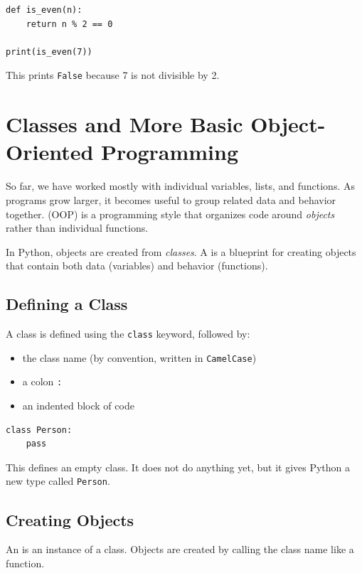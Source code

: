 \begin{Answer}[ref=functions2]
\begin{verbatim}
def is_even(n):
    return n % 2 == 0

print(is_even(7))
\end{verbatim}
This prints \texttt{False} because 7 is not divisible by 2.
\end{Answer}

\section{Classes and More Basic Object-Oriented Programming}

So far, we have worked mostly with individual variables, lists, and functions.
As programs grow larger, it becomes useful to group related data and behavior
together. 
(OOP) is a programming style that organizes code around \emph{objects} rather than
individual functions.

In Python, objects are created from \emph{classes}. A 
is a blueprint for creating objects that contain both data (variables) and
behavior (functions).

\subsection{Defining a Class}
A class is defined using the \texttt{class} keyword, followed by:
\begin{itemize}
    \item the class name (by convention, written in \texttt{CamelCase})
    \item a colon \texttt{:}
    \item an indented block of code
\end{itemize}

\begin{verbatim}
class Person:
    pass
\end{verbatim}

This defines an empty class. It does not do anything yet, but it gives Python a
new type called \texttt{Person}.

\subsection{Creating Objects}
An  is an instance of a class. Objects are created
by calling the class name like a function.

